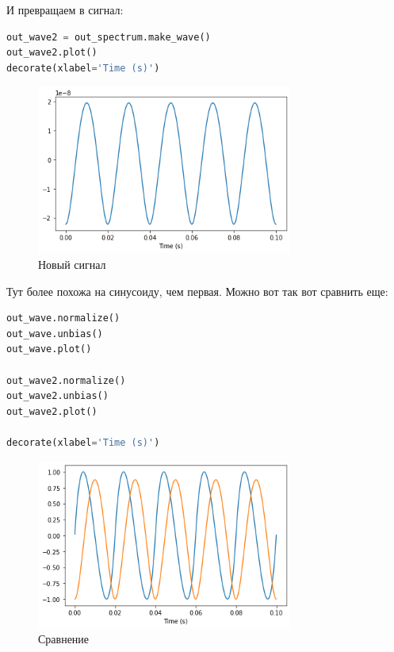 \documentclass[a4paper,12pt]{report}
\begin{document}
    И превращаем в сигнал:
    
\begin{lstlisting}[language=Python,caption=Новый сигнал]
out_wave2 = out_spectrum.make_wave()
out_wave2.plot()
decorate(xlabel='Time (s)')
\end{lstlisting}

    \begin{figure}[H]
        \centering
        \includegraphics[width=0.75\textwidth]{ex3_out_wave2.png}
        \caption{Новый сигнал}
        \label{fig:ex3_out_wave2}
    \end{figure}

    Тут  более похожа на синусоиду, чем первая. Можно вот так вот сравнить еще:
    
\begin{lstlisting}[language=Python,caption=Сравнение]
out_wave.normalize()
out_wave.unbias()
out_wave.plot()

out_wave2.normalize()
out_wave2.unbias()
out_wave2.plot()

decorate(xlabel='Time (s)')
\end{lstlisting}

    \begin{figure}[H]
        \centering
        \includegraphics[width=0.75\textwidth]{ex3_comparison.png}
        \caption{Сравнение}
        \label{fig:ex3_comparison}
    \end{figure}
\end{document}
